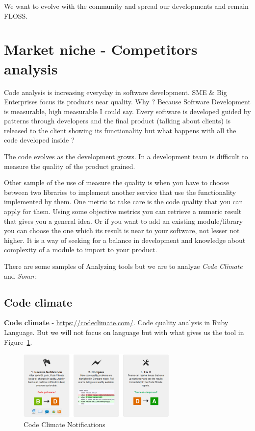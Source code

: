 \documentclass[11pt]{scrartcl}
\begin{document}
\par We want to evolve with the community and spread our developments and remain FLOSS.

\section{Market niche - Competitors analysis}
\label{sec:market-niche}

\par Code analysis is increasing everyday in software development. SME \& Big Enterprises focus its products near quality. Why ? Because Software Development is measurable, high measurable I could say. Every software is developed guided by patterns through developers and the final product (talking about clients) is released to the client showing its functionality but what happens with all the code developed inside ?

\par The code evolves as the development grows. In a development team is difficult to measure the quality of the product grained.

\par Other sample of the use of measure the quality is when you have to choose between two libraries to implement another service that use the functionality implemented by them. One metric to take care is the code quality that you can apply for them. Using some objective metrics you can retrieve a numeric result that gives you a general idea. Or if you want to add an existing module/library you can choose the one which its result is near to your software, not lesser not higher. It is a way of seeking for a balance in development and knowledge about complexity of a module to import to your product.

\par There are some samples of Analyzing tools but we are to analyze \emph{Code Climate} and \emph{Sonar}.

\subsection{Code climate}
\label{sub:code-climate}

\textbf{Code climate} - \url{https://codeclimate.com/}. Code quality analysis in Ruby Language. But we will not focus on language but with what gives us the tool in Figure~\ref{code-climate}.

\begin{figure}[H]
\centering
\includegraphics[width=0.7\textwidth]{code-climate.png}
\caption{Code Climate Notifications}
\label{code-climate}
\end{figure}
\end{document}
